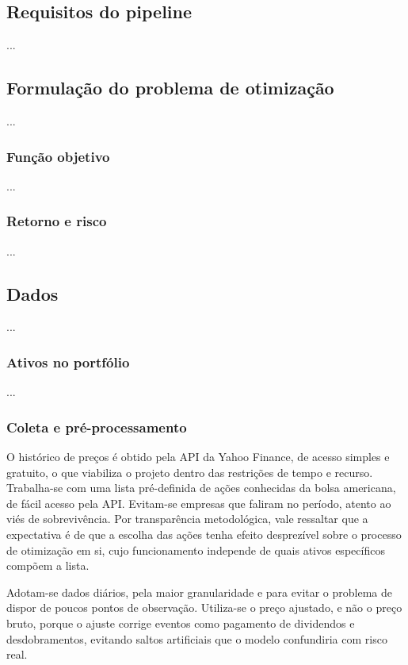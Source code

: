 \documentclass[12pt,a4paper]{article}
\begin{document}
\subsection{Requisitos do pipeline}

...

\subsection{Formulação do problema de otimização}
\label{sub:formulacao}
...

\subsubsection{Função objetivo}
...

\subsubsection{Retorno e risco}
...

\subsection{Dados}
...

\subsubsection{Ativos no portfólio}
...

\subsubsection{Coleta e pré-processamento}
O histórico de preços é obtido pela API da Yahoo Finance, de acesso simples e gratuito, o que viabiliza o projeto dentro das restrições de tempo e recurso. Trabalha-se com uma lista pré-definida de ações conhecidas da bolsa americana, de fácil acesso pela API. Evitam-se empresas que faliram no período, atento ao viés de sobrevivência. Por transparência metodológica, vale ressaltar que a expectativa é de que a escolha das ações tenha efeito desprezível sobre o processo de otimização em si, cujo funcionamento independe de quais ativos específicos compõem a lista.

Adotam-se dados diários, pela maior granularidade e para evitar o problema de dispor de poucos pontos de observação. Utiliza-se o preço ajustado, e não o preço bruto, porque o ajuste corrige eventos como pagamento de dividendos e desdobramentos, evitando saltos artificiais que o modelo confundiria com risco real.
\end{document}
